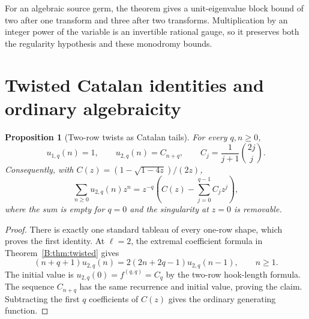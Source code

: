 \documentclass[11pt,a4paper]{article}
\newtheorem{proposition}[theorem]{Proposition}
\theoremstyle{definition}
\theoremstyle{remark}
\numberwithin{equation}{section}
\begin{document}
For an algebraic source germ, the theorem gives a unit-eigenvalue block
bound of two after one transform and three after two transforms.
Multiplication by an integer power of the variable is an invertible
rational gauge, so it preserves both the regularity hypothesis and
these monodromy bounds.

\section{Twisted Catalan identities and ordinary algebraicity}
\label{B:up:twist-algebraicity-section}

\begin{proposition}[Two-row twists as Catalan tails]
\label{B:up:twist-catalan}
For every $q,n\ge0$,
\[
 u_{1,q}(n)=1,\qquad
 u_{2,q}(n)=C_{n+q},\qquad
 C_j=\frac1{j+1}\binom{2j}{j}.
\]
Consequently, with $C(z)=(1-\sqrt{1-4z})/(2z)$,
\[
 \sum_{n\ge0}u_{2,q}(n)z^n
 =z^{-q}\left(C(z)-\sum_{j=0}^{q-1}C_jz^j\right),
\]
where the sum is empty for $q=0$ and the singularity at $z=0$
is removable.
\end{proposition}
\begin{proof}
There is exactly one standard tableau of every one-row shape,
which proves the first identity.  At $\ell=2$, the extremal
coefficient formula in Theorem~\ref{B:thm:twisted} gives
\[
 (n+q+1)u_{2,q}(n)
 =2(2n+2q-1)u_{2,q}(n-1),\qquad n\ge1.
\]
The initial value is $u_{2,q}(0)=f^{(q,q)}=C_q$ by the
two-row hook-length formula.  The sequence $C_{n+q}$ has the
same recurrence and initial value, proving the claim.
Subtracting the first $q$ coefficients of $C(z)$ gives the
ordinary generating function.
\end{proof}
\end{document}
